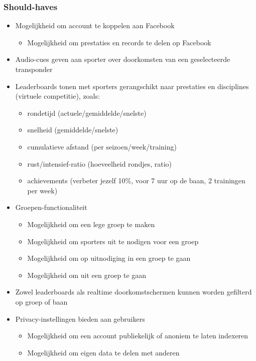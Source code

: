 \subsubsection{Should-haves}

\begin{itemize} \parskip0pt 
    \item Mogelijkheid om account te koppelen aan Facebook
    \begin{itemize}
        \item Mogelijkheid om prestaties en records te delen op Facebook
    \end{itemize}
    \item Audio-cues geven aan sporter over doorkomsten van een geselecteerde transponder
    \item Leaderboards tonen met sporters gerangschikt naar prestaties en disciplines (virtuele competitie), zoals:
    \begin{itemize}
        \item rondetijd (actuele/gemiddelde/snelste)
        \item snelheid (gemiddelde/snelste)
        \item cumulatieve afstand (per seizoen/week/training)
        \item rust/intensief-ratio (hoeveelheid rondjes, ratio)
        \item achievements (verbeter jezelf 10\%, voor 7 uur op de baan, 2 trainingen per week)
    \end{itemize}
    
    \item Groepen-functionaliteit \begin{itemize}
        \item Mogelijkheid om een lege groep te maken
        \item Mogelijkheid om sporters uit te nodigen voor een groep
        \item Mogelijkheid om op uitnodiging in een groep te gaan
        \item Mogelijkheid om uit een groep te gaan
    \end{itemize}

    \item Zowel leaderboards als realtime doorkomstschermen kunnen worden gefilterd op groep of baan
     
    \item Privacy-instellingen bieden aan gebruikers
    \begin{itemize}
        \item Mogelijkheid om een account publiekelijk of anoniem te laten indexeren
        \item Mogelijkheid om eigen data te delen met anderen
    \end{itemize}

\end{itemize}

